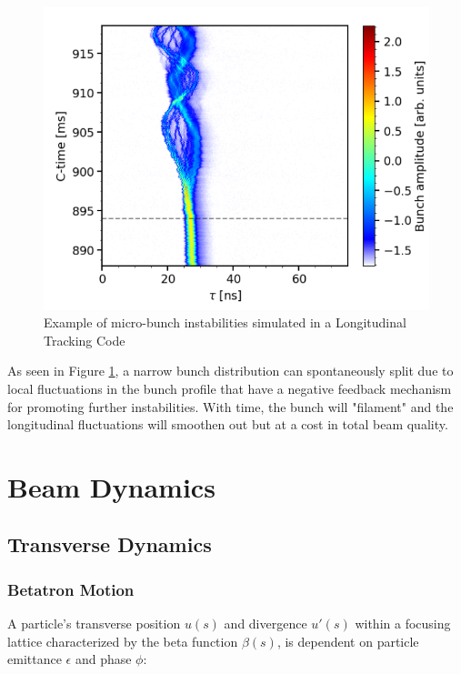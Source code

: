 \begin{figure}
    \centering
    \includegraphics{figs/micro_bunching_instabilities.PNG}
    \caption{Example of micro-bunch instabilities simulated in a Longitudinal Tracking Code}
    \label{fig:microbunch_instabilities}
\end{figure}

As seen in Figure \ref{fig:microbunch_instabilities}, a narrow bunch distribution can spontaneously split due to local fluctuations in the bunch profile that have a negative feedback mechanism for promoting further instabilities. With time, the bunch will "filament" and the longitudinal fluctuations will smoothen out but at a cost in total beam quality.

\chapter{Beam Dynamics}

\section{Transverse Dynamics}

\subsection{Betatron Motion}

A particle's transverse position $u(s)$ and divergence $u'(s)$ within a focusing lattice characterized by the beta function $\beta(s)$, is dependent on particle emittance $\epsilon$ and phase $\phi$:

